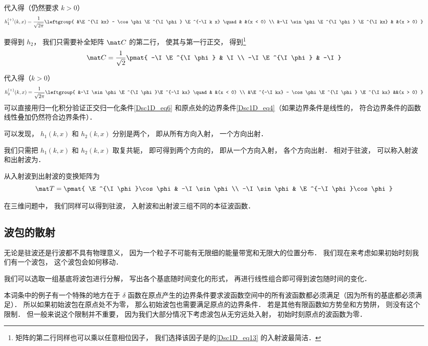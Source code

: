 代入得（仍然要求 $k > 0$）
\begin{equation}\label{Dsc1D_eq11}
h_1^{(+)}(k, x) =  \frac{1}{\sqrt{2\pi}}\leftgroup{
&\E^{\I kx} - \cos\phi \E^{\I\phi} \E^{-\I k x} \quad & &(x < 0) \\
&-\I\sin\phi\E^{\I\phi} \E^{\I kx}  & &(x > 0)
}\end{equation}

要得到 $h_2$， 我们只需要补全矩阵 $\mat C$ 的第二行， 使其与第一行正交， 得到\footnote{矩阵的第二行同样也可以乘以任意相位因子， 我们选择该因子是的\autoref{Dsc1D_eq13} 的入射波最简洁．}
\begin{equation}
\mat C = \frac{1}{\sqrt{2}}\pmat{
-\I\E^{\I \phi} & \I \\
-\I\E^{\I \phi} & -\I
}\end{equation}

代入得（$k > 0$）
\begin{equation}\label{Dsc1D_eq13}
h_2^{(+)}(k, x) =  \frac{1}{\sqrt{2\pi}} \leftgroup{
&-\I\sin\phi\E^{\I\phi}\E^{-\I kx} \quad & &(x < 0) \\
&\E^{-\I kx} - \cos\phi \E^{\I \phi} \E^{\I kx} &&(x > 0)
}\end{equation}
可以直接用归一化积分验证正交归一化条件\autoref{Dsc1D_eq6} 和原点处的边界条件\autoref{Dsc1D_eq4}（如果边界条件是线性的， 符合边界条件的函数线性叠加仍然符合边界条件）．

可以发现， $h_1(k, x)$ 和 $h_2(k, x)$ 分别是两个， 即从所有方向入射， 一个方向出射．

我们只需把 $h_1(k, x)$ 和 $h_2(k, x)$ 取复共轭， 即可得到两个方向的， 即从一个方向入射， 各个方向出射． 相对于驻波， 可以称入射波和出射波为．

从入射波到出射波的变换矩阵为
\begin{equation}
\mat T = \pmat{
\E^{\I\phi}\cos\phi & -\I \sin\phi \\
-\I \sin\phi & \E^{-\I\phi}\cos\phi
}\end{equation}

在三维问题中， 我们同样可以得到驻波， 入射波和出射波三组不同的本征波函数．

\subsection{波包的散射}
无论是驻波还是行波都不具有物理意义， 因为一个粒子不可能有无限细的能量带宽和无限大的位置分布． 我们现在来考虑如果初始时刻我们有一个波包， 这个波包会如何移动．

我们可以选取一组基底将波包进行分解， 写出各个基底随时间变化的形式， 再进行线性组合即可得到波包随时间的变化．

本词条中的例子有一个特殊的地方在于 $\delta$ 函数在原点产生的边界条件要求波函数空间中的所有波函数都必须满足（因为所有的基底都必须满足）． 所以如果初始波包在原点处不为零， 那么初始波包也需要满足原点的边界条件． 若是其他有限函数如方势垒和方势阱， 则没有这个限制． 但一般来说这个限制并不重要， 因为我们大部分情况下考虑波包从无穷远处入射， 初始时刻原点的波函数为零．


